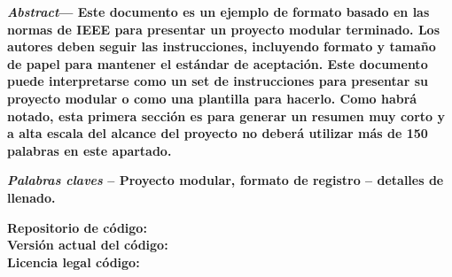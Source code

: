 \clearpage
\onecolumn %
\tableofcontents





\titlespacing*{\section}{0pt}{10.1pt}{2.7pt}

\titlespacing*{\subsection}{0pt}{7.1pt}{2.25pt}

\titlespacing*{\subsubsection}{0pt}{0pt}{0pt}

\twocolumn
\maketitle

{\small
	\noindent
	\textbf{\textit{Abstract}--- Este documento es un ejemplo de formato basado en las
		normas de IEEE para presentar un proyecto modular terminado. Los autores deben seguir
		las instrucciones, incluyendo formato y tamaño de papel para mantener el
		estándar de aceptación. Este documento puede interpretarse como un set de instrucciones
		para presentar su proyecto modular o como una plantilla para hacerlo. Como habrá
		notado, esta primera sección es para generar un resumen muy corto y a alta escala
		del alcance del proyecto no deberá utilizar más de 150 palabras en este apartado.
	}
	\par\vspace{11pt}
	\noindent
	\textbf{\textit{Palabras claves} -- Proyecto modular, formato de registro -- detalles de llenado.}
	\par\vspace{11pt}
	\noindent
	\textbf{Repositorio de código: \repositorio \\
		Versión actual del código: \version \\
		Licencia legal código: \licencia
	}
}


